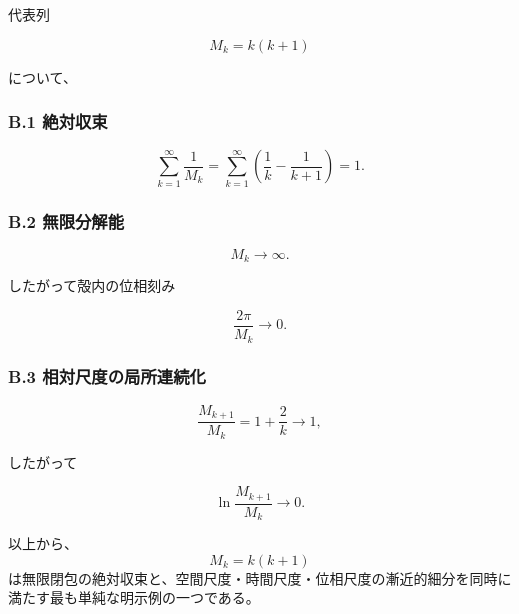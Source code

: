 \documentclass[
  a4paper,
]{ltjsarticle}
\begin{document}
代表列

\[
M_k=k(k+1)
\]

について、

\subsubsection{B.1 絶対収束}\label{b.1-ux7d76ux5bfeux53ceux675f}

\[
\sum_{k=1}^{\infty}\frac{1}{M_k}
=
\sum_{k=1}^{\infty}
\left(\frac1k-\frac1{k+1}\right)
=1.
\]

\subsubsection{B.2 無限分解能}\label{b.2-ux7121ux9650ux5206ux89e3ux80fd}

\[
M_k\to\infty.
\]

したがって殻内の位相刻み

\[
\frac{2\pi}{M_k}\to0.
\]

\subsubsection{B.3
相対尺度の局所連続化}\label{b.3-ux76f8ux5bfeux5c3aux5ea6ux306eux5c40ux6240ux9023ux7d9aux5316}

\[
\frac{M_{k+1}}{M_k}
=1+\frac{2}{k}
\to1,
\]

したがって

\[
\ln\frac{M_{k+1}}{M_k}
\to0.
\]

以上から、\[M_k=k(k+1)\]
は無限閉包の絶対収束と、空間尺度・時間尺度・位相尺度の漸近的細分を同時に満たす最も単純な明示例の一つである。
\end{document}
